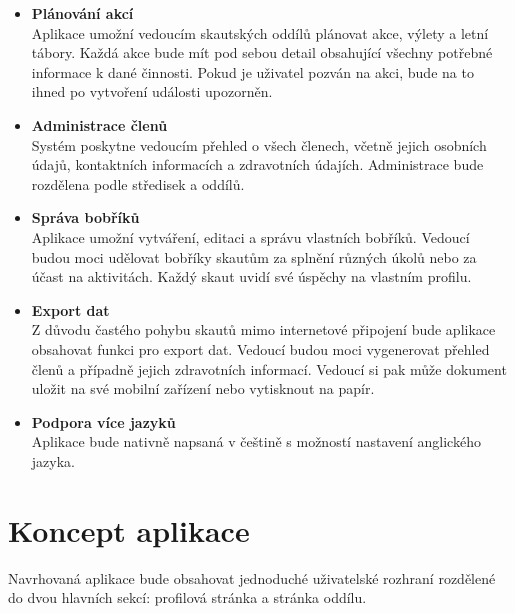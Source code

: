 \documentclass[twoside]{ctuthesis}
\begin{document}
\begin{itemize}
\item \textbf{Plánování akcí} \\
Aplikace umožní vedoucím skautských oddílů plánovat akce, výlety a letní tábory. Každá akce bude mít pod sebou detail obsahující všechny potřebné informace k dané činnosti. Pokud je uživatel pozván na akci, bude na to ihned po vytvoření události upozorněn.

\item \textbf{Administrace členů} \\
Systém poskytne vedoucím přehled o všech členech, včetně jejich osobních údajů, kontaktních informacích a zdravotních údajích. Administrace bude rozdělena podle středisek a oddílů.

\item \textbf{Správa bobříků} \\
Aplikace umožní vytváření, editaci a správu vlastních bobříků. Vedoucí budou moci udělovat bobříky skautům za splnění různých úkolů nebo za účast na aktivitách. Každý skaut uvidí své úspěchy na vlastním profilu.

\item \textbf{Export dat} \\
Z důvodu častého pohybu skautů mimo internetové připojení bude aplikace obsahovat funkci pro export dat. Vedoucí budou moci vygenerovat přehled členů a případně jejich zdravotních informací. Vedoucí si pak může dokument uložit na své mobilní zařízení nebo vytisknout na papír.

\item \textbf{Podpora více jazyků} \\
Aplikace bude nativně napsaná v češtině s možností nastavení anglického jazyka.
\end{itemize}

\section{Koncept aplikace}

Navrhovaná aplikace bude obsahovat jednoduché uživatelské rozhraní rozdělené do dvou hlavních sekcí: profilová stránka a stránka oddílu.
\end{document}
